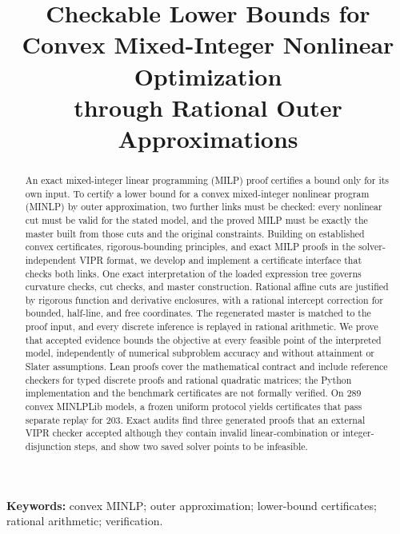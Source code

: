 \documentclass[11pt]{article}
\title{Checkable Lower Bounds for Convex Mixed-Integer Nonlinear Optimization\\
through Rational Outer Approximations}
\author{}
\date{}
\theoremstyle{definition}
\begin{document}
\maketitle
\begin{abstract}
An exact mixed-integer linear programming (MILP) proof certifies a bound only for its own input. To certify a lower bound for a convex mixed-integer nonlinear program (MINLP) by outer approximation, two further links must be checked: every nonlinear cut must be valid for the stated model, and the proved MILP must be exactly the master built from those cuts and the original constraints. Building on established convex certificates, rigorous-bounding principles, and exact MILP proofs in the solver-independent VIPR format, we develop and implement a certificate interface that checks both links. One exact interpretation of the loaded expression tree governs curvature checks, cut checks, and master construction. Rational affine cuts are justified by rigorous function and derivative enclosures, with a rational intercept correction for bounded, half-line, and free coordinates. The regenerated master is matched to the proof input, and every discrete inference is replayed in rational arithmetic. We prove that accepted evidence bounds the objective at every feasible point of the interpreted model, independently of numerical subproblem accuracy and without attainment or Slater assumptions. Lean proofs cover the mathematical contract and include reference checkers for typed discrete proofs and rational quadratic matrices; the Python implementation and the benchmark certificates are not formally verified. On 289 convex MINLPLib models, a frozen uniform protocol yields certificates that pass separate replay for 203. Exact audits find three generated proofs that an external VIPR checker accepted although they contain invalid linear-combination or integer-disjunction steps, and show two saved solver points to be infeasible.
\end{abstract}
\noindent\textbf{Keywords:} convex MINLP; outer approximation; lower-bound certificates; rational arithmetic; verification.







\appendix




\end{document}
